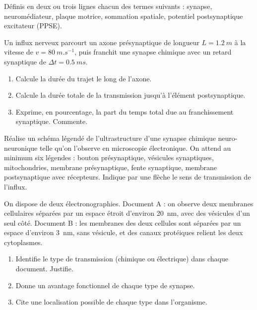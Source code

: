 \documentclass[11pt]{article}
\newcommand{\cle}[1]{{\popxbold\color{popdark}#1}}
\newcounter{popsec}
\newcounter{popsub}
\newcommand{\courssub}[1]{%
  \stepcounter{popsub}%
  \par\vspace{9pt}\noindent{\popxbold\fontsize{11.5}{13}\selectfont\color{popink}{\color{poporange}\thepopsec.\thepopsub}\hspace{6pt}#1}\par\nopagebreak\vspace{4pt}
}
\begin{document}
\begin{exercice}[Définitions]
Définis en deux ou trois lignes chacun des termes suivants : \cle{synapse}, \cle{neuromédiateur}, \cle{plaque motrice}, \cle{sommation spatiale}, \cle{potentiel postsynaptique excitateur} (PPSE).
\end{exercice}

\begin{exercice}
Un influx nerveux parcourt un axone présynaptique de longueur $L = \SI{1,2}{m}$ à la vitesse de $v = \SI{80}{m.s^{-1}}$, puis franchit une synapse chimique avec un retard synaptique de $\Delta t = \SI{0,5}{ms}$.
\begin{enumerate}
\item Calcule la durée du trajet le long de l'axone.
\item Calcule la durée totale de la transmission jusqu'à l'élément postsynaptique.
\item Exprime, en pourcentage, la part du temps total due au franchissement synaptique. Commente.
\end{enumerate}
\end{exercice}

\courssub{Je m'entraîne}

\begin{exercice}
Réalise un schéma légendé de l'ultrastructure d'une synapse chimique neuro-neuronique telle qu'on l'observe en microscopie électronique. On attend au minimum six légendes : bouton présynaptique, vésicules synaptiques, mitochondries, membrane présynaptique, fente synaptique, membrane postsynaptique avec récepteurs. Indique par une flèche le sens de transmission de l'influx.
\end{exercice}

\begin{exercice}
On dispose de deux électronographies. Document A : on observe deux membranes cellulaires séparées par un espace étroit d'environ \SI{20}{nm}, avec des vésicules d'un seul côté. Document B : les membranes des deux cellules sont séparées par un espace d'environ \SI{3}{nm}, sans vésicule, et des canaux protéiques relient les deux cytoplasmes.
\begin{enumerate}
\item Identifie le type de transmission (chimique ou électrique) dans chaque document. Justifie.
\item Donne un avantage fonctionnel de chaque type de synapse.
\item Cite une localisation possible de chaque type dans l'organisme.
\end{enumerate}
\end{exercice}
\end{document}
